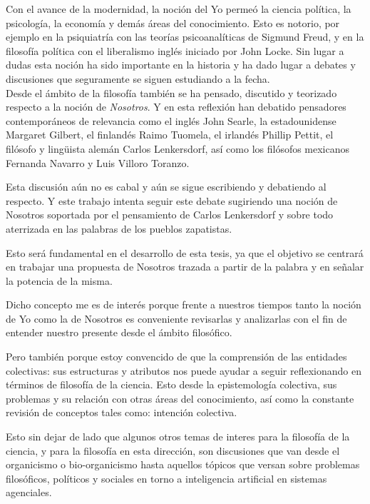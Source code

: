 \documentclass[oneside]{book}
\begin{document}
Con el avance de la modernidad, la noción del Yo permeó la ciencia política, la psicología, la economía y demás áreas del conocimiento. Esto es notorio, por ejemplo en la psiquiatría con las teorías psicoanalíticas de Sigmund Freud\cite{Freud}, y en la filosofía política con el liberalismo inglés iniciado por John Locke\cite{Locke}. Sin lugar a dudas esta noción ha sido importante en la historia y ha dado lugar a debates y discusiones que seguramente se siguen estudiando a la fecha.\\

Desde el ámbito de la filosofía también se ha pensado, discutido y teorizado respecto a la noción de \textit{Nosotros}. Y en esta reflexión han debatido pensadores contemporáneos de relevancia como el inglés John Searle, la estadounidense Margaret Gilbert, el finlandés Raimo Tuomela, el irlandés Phillip Pettit, el filósofo y lingüista alemán Carlos Lenkersdorf, así como los filósofos mexicanos Fernanda Navarro y Luis Villoro Toranzo.

Esta discusión aún no es cabal y aún se sigue escribiendo y debatiendo al respecto. Y este trabajo intenta seguir este debate sugiriendo una noción de Nosotros soportada por el pensamiento de Carlos Lenkersdorf  y sobre todo aterrizada en las palabras de los pueblos zapatistas.

Esto será fundamental en el desarrollo de esta tesis, ya que el objetivo se centrará en trabajar una propuesta de Nosotros trazada a partir de la palabra y en señalar la potencia de la misma. 

Dicho concepto me es de interés porque frente a nuestros tiempos tanto la noción de Yo como la de Nosotros es conveniente revisarlas y analizarlas con el fin de entender nuestro presente desde el ámbito filosófico.

Pero también porque estoy convencido de que la comprensión de las entidades colectivas: sus estructuras y atributos nos puede ayudar a seguir reflexionando en términos de filosofía de la ciencia. Esto desde la epistemología colectiva, sus problemas y su relación con otras áreas del conocimiento, así como la constante revisión de conceptos tales como: intención colectiva. 

Esto sin dejar de lado que algunos otros temas de interes para la filosofía de la ciencia, y para la filosofía en esta dirección, son discusiones que van desde el organicismo o bio-organicismo hasta aquellos tópicos que versan sobre problemas filosóficos, políticos y sociales en torno a inteligencia artificial en sistemas agenciales.
\end{document}
